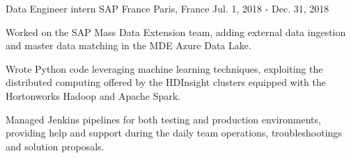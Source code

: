 

\begin{cventries}

  \cventry
    {Data Engineer intern} %
    {SAP France} %
    {Paris, France} %
    {Jul. 1, 2018 - Dec. 31, 2018} %
    {
      \begin{cvitems} %
        \item {Worked on the SAP Mass Data Extension team, adding external data ingestion and master data matching in the MDE Azure Data Lake.}
        \item {Wrote Python code leveraging machine learning techniques, exploiting the distributed computing offered by the HDInsight clusters equipped with the Hortonworks Hadoop and Apache Spark.}
        \item {Managed Jenkins pipelines for both testing and production environments, providing help and support during the daily team operations, troubleshootings and solution proposals.}
      \end{cvitems}
    }
\end{cventries}
